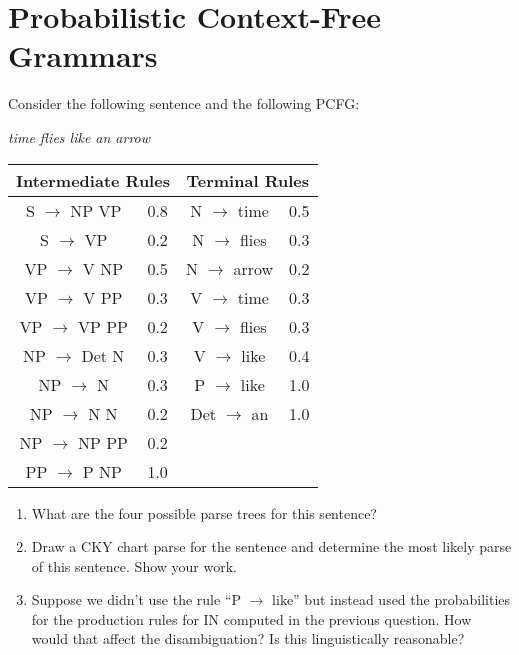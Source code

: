 \documentclass[11pt,twoside]{article}
\begin{document}
\begin{enumerate}
\end{enumerate}

\section{Probabilistic Context-Free Grammars}

Consider the following sentence and the following PCFG:

\begin{center}
	{\em time flies like an arrow }\\ 
\begin{tabular}{cl|cl}
\multicolumn{2}{c}{Intermediate Rules} & \multicolumn{2}{c}{Terminal Rules} \\
\hline
S $\rightarrow$ NP VP& 0.8 & N $\rightarrow$ time& 0.5 \\
S $\rightarrow$ VP& 0.2&  N $\rightarrow$ flies& 0.3 \\
VP $\rightarrow$ V NP& 0.5 & N $\rightarrow$ arrow& 0.2\\ 
VP $\rightarrow$ V PP& 0.3&  V $\rightarrow$ time& 0.3 \\
VP $\rightarrow$ VP PP& 0.2 & V $\rightarrow$ flies& 0.3 \\
NP $\rightarrow$ Det N& 0.3&  V $\rightarrow$ like& 0.4 \\
NP $\rightarrow$ N& 0.3&  P $\rightarrow$ like &1.0 \\
NP $\rightarrow$ N N& 0.2 & Det $\rightarrow$ an & 1.0 \\
NP $\rightarrow$ NP PP& 0.2 & \\
PP $\rightarrow$ P NP & 1.0 & \\
\end{tabular}
\end{center}

\begin{enumerate}
\item What are the four possible parse trees for this sentence?
\item Draw a CKY chart parse for the sentence and determine the most likely parse of this sentence.  Show your work.
\item Suppose we didn't use the rule ``P $\rightarrow$ like'' but instead used the probabilities for the production rules for IN computed in the previous question.  How would that affect the disambiguation?  Is this linguistically reasonable?
\end{enumerate}
\end{document}
